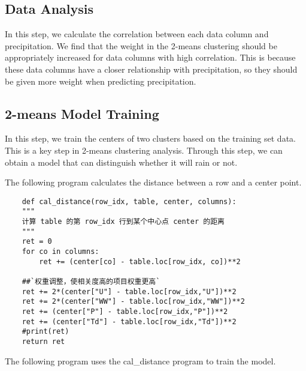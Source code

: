 \documentclass[twocolumn]{article}
\begin{document}
\subsection{Data Analysis}

In this step, we calculate the correlation between each data column and precipitation. We find that the weight in the 2-means clustering should be appropriately increased for data columns with high correlation. This is because these data columns have a closer relationship with precipitation, so they should be given more weight when predicting precipitation.



\subsection{2-means Model Training}

In this step, we train the centers of two clusters based on the training set data. This is a key step in 2-means clustering analysis. Through this step, we can obtain a model that can distinguish whether it will rain or not.

The following program calculates the distance between a row and a center point.
\begin{lstlisting}
    def cal_distance(row_idx, table, center, columns):
    """
    计算 table 的第 row_idx 行到某个中心点 center 的距离
    """
    ret = 0
    for co in columns:
        ret += (center[co] - table.loc[row_idx, co])**2

    ##`权重调整，使相关度高的项目权重更高`
    ret += 2*(center["U"] - table.loc[row_idx,"U"])**2
    ret += 2*(center["WW"] - table.loc[row_idx,"WW"])**2
    ret += (center["P"] - table.loc[row_idx,"P"])**2
    ret += (center["Td"] - table.loc[row_idx,"Td"])**2
    #print(ret)
    return ret
\end{lstlisting}

The following program uses the cal\_distance program to train the model.
\end{document}
